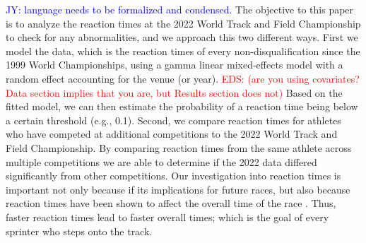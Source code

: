 \documentclass[12pt, letterpaper, titlepage]{article}
\newcommand{\jy}[1]{\textcolor{blue}{JY: #1}}
\newcommand{\eds}[1]{\textcolor{red}{EDS: (#1)}}
\begin{document}
\jy{language needs to be formalized and condensed.}
The objective to this paper is to analyze the reaction times at the 2022 World 
Track and Field Championship to check for any abnormalities, and we approach
this two different ways.  First we model the data, which is
the reaction times of every non-disqualification since the 1999 World 
Championships, using a gamma linear mixed-effects model with a random effect 
accounting for the venue (or year). \eds{are you using covariates?  Data section
implies that you are, but Results section does not} 
Based on the fitted model, we can then estimate the probability of a reaction 
time being below a certain threshold (e.g., 0.1). 
Second, we compare reaction times for athletes who have competed
at additional competitions to the 2022 World Track and Field Championship.  By
comparing reaction times from the same athlete across multiple competitions we 
are able to determine if the 2022 data differed significantly from other 
competitions.
Our investigation into reaction times is important not only because if its
implications for future races, but also because reaction times have
been shown to affect the overall time of the race \citep{delalija2008reaction}.
Thus, faster reaction times lead to faster overall times; which is the goal of
every sprinter who steps onto the track.
\end{document}
